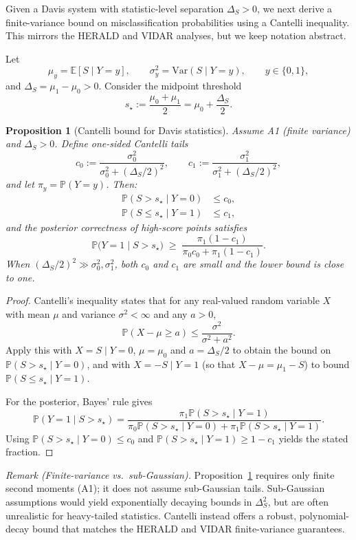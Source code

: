 \documentclass[11pt]{article}
\newcommand{\Prob}{\mathbb{P}}
\newcommand{\Var}{\mathrm{Var}}
\newtheorem{proposition}{Proposition}
\theoremstyle{remark}
\theoremstyle{plain}
\begin{document}
Given a Davis system with statistic-level separation $\Delta_S > 0$, we next derive a finite-variance
bound on misclassification probabilities using a Cantelli inequality. This mirrors the HERALD
and VIDAR analyses, but we keep notation abstract.

Let
\[
\mu_y = \mathbb{E}[S \mid Y=y],\qquad
\sigma_y^2 = \Var(S \mid Y=y),\qquad y \in \{0,1\},
\]
and $\Delta_S = \mu_1 - \mu_0 > 0$. Consider the midpoint threshold
\[
s_\star := \frac{\mu_0 + \mu_1}{2} = \mu_0 + \frac{\Delta_S}{2}.
\]

\begin{proposition}[Cantelli bound for Davis statistics]
\label{prop:davis-cantelli}
Assume A1 (finite variance) and $\Delta_S > 0$. Define one-sided Cantelli tails
\[
c_0 := \frac{\sigma_0^2}{\sigma_0^2 + (\Delta_S/2)^2},\qquad
c_1 := \frac{\sigma_1^2}{\sigma_1^2 + (\Delta_S/2)^2},
\]
and let $\pi_y = \Prob(Y=y)$. Then:
\begin{align*}
\Prob(S > s_\star \mid Y=0) &\le c_0,\\
\Prob(S \le s_\star \mid Y=1) &\le c_1,
\end{align*}
and the posterior correctness of high-score points satisfies
\[
\Prob\bigl(Y=1 \mid S > s_\star\bigr)
\;\ge\;
\frac{\pi_1 (1-c_1)}
     {\pi_0 c_0 + \pi_1 (1-c_1)}.
\]
When $(\Delta_S/2)^2 \gg \sigma_0^2,\sigma_1^2$, both $c_0$ and $c_1$ are small and the lower
bound is close to one.
\end{proposition}

\begin{proof}
Cantelli’s inequality states that for any real-valued random variable $X$ with mean $\mu$ and
variance $\sigma^2<\infty$ and any $a>0$,
\[
\Prob(X-\mu \ge a) \le \frac{\sigma^2}{\sigma^2 + a^2}.
\]
Apply this with $X=S\mid Y=0$, $\mu=\mu_0$ and $a=\Delta_S/2$ to obtain the bound on
$\Prob(S>s_\star\mid Y=0)$, and with $X=-S\mid Y=1$ (so that $X-\mu = \mu_1-S$) to bound
$\Prob(S\le s_\star\mid Y=1)$.

For the posterior, Bayes’ rule gives
\[
\Prob(Y=1 \mid S > s_\star) =
\frac{\pi_1 \Prob(S > s_\star \mid Y=1)}
     {\pi_0 \Prob(S > s_\star \mid Y=0) +
      \pi_1 \Prob(S > s_\star \mid Y=1)}.
\]
Using $\Prob(S > s_\star \mid Y=0) \le c_0$ and
$\Prob(S > s_\star \mid Y=1) \ge 1 - c_1$ yields the stated fraction.
\end{proof}

\noindent\emph{Remark (Finite-variance vs.\ sub-Gaussian).} Proposition~\ref{prop:davis-cantelli}
requires only finite second moments (A1); it does not assume sub-Gaussian tails. Sub-Gaussian
assumptions would yield exponentially decaying bounds in $\Delta_S^2$, but are often unrealistic
for heavy-tailed statistics. Cantelli instead offers a robust, polynomial-decay bound that matches
the HERALD and VIDAR finite-variance guarantees.
\end{document}
